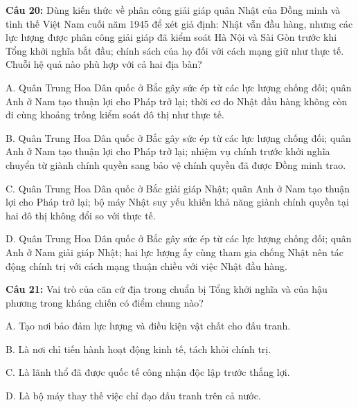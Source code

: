 \documentclass[12pt,a4paper]{article}
\begin{document}
\par\noindent\begin{minipage}{\linewidth}
\noindent\textbf{Câu 20:} Dùng kiến thức về phân công giải giáp quân Nhật của Đồng minh và tình thế Việt Nam cuối năm 1945 để xét giả định: Nhật vẫn đầu hàng, nhưng các lực lượng được phân công giải giáp đã kiểm soát Hà Nội và Sài Gòn trước khi Tổng khởi nghĩa bắt đầu; chính sách của họ đối với cách mạng giữ như thực tế. Chuỗi hệ quả nào phù hợp với cả hai địa bàn?\par
\noindent A. Quân Trung Hoa Dân quốc ở Bắc gây sức ép từ các lực lượng chống đối; quân Anh ở Nam tạo thuận lợi cho Pháp trở lại; thời cơ do Nhật đầu hàng không còn đi cùng khoảng trống kiểm soát đô thị như thực tế.\par
\noindent B. Quân Trung Hoa Dân quốc ở Bắc gây sức ép từ các lực lượng chống đối; quân Anh ở Nam tạo thuận lợi cho Pháp trở lại; nhiệm vụ chính trước khởi nghĩa chuyển từ giành chính quyền sang bảo vệ chính quyền đã được Đồng minh trao.\par
\noindent C. Quân Trung Hoa Dân quốc ở Bắc giải giáp Nhật; quân Anh ở Nam tạo thuận lợi cho Pháp trở lại; bộ máy Nhật suy yếu khiến khả năng giành chính quyền tại hai đô thị không đổi so với thực tế.\par
\noindent D. Quân Trung Hoa Dân quốc ở Bắc gây sức ép từ các lực lượng chống đối; quân Anh ở Nam giải giáp Nhật; hai lực lượng ấy cùng tham gia chống Nhật nên tác động chính trị với cách mạng thuận chiều với việc Nhật đầu hàng.\par
\end{minipage}\par\vspace{0.12cm}

\par\noindent\begin{minipage}{\linewidth}
\noindent\textbf{Câu 21:} Vai trò của căn cứ địa trong chuẩn bị Tổng khởi nghĩa và của hậu phương trong kháng chiến có điểm chung nào?\par
\noindent A. Tạo nơi bảo đảm lực lượng và điều kiện vật chất cho đấu tranh.\par
\noindent B. Là nơi chỉ tiến hành hoạt động kinh tế, tách khỏi chính trị.\par
\noindent C. Là lãnh thổ đã được quốc tế công nhận độc lập trước thắng lợi.\par
\noindent D. Là bộ máy thay thế việc chỉ đạo đấu tranh trên cả nước.\par
\end{minipage}\par\vspace{0.12cm}
\end{document}
